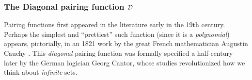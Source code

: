 \subsubsection{The Diagonal pairing function $\mbox{$\cal D$}$}
\label{sec:diag-pair-fn}

Pairing functions first appeared in the literature early in the 19th
century.  Perhaps the simplest and ``prettiest'' such function (since
it is a {\em polynomial}) appears, pictorially, in an 1821 work by the
great French mathematician Augustin Cauchy \cite{Cauchy21}.
%
This {\em diagonal} pairing function was formally specified a
half-century later by the German logician Georg Cantor,
%
whose studies \cite{Cantor74,Cantor78} revolutionized how we think
about {\em infinite} sets.

